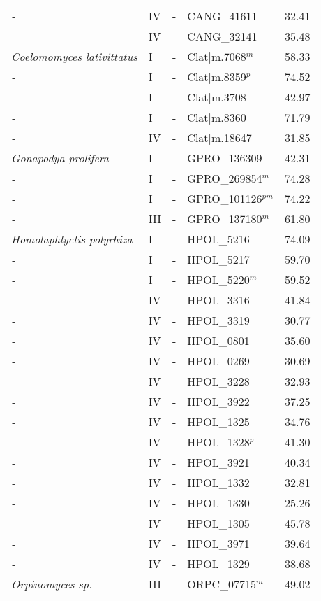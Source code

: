 {{\begin{longtable}{llllr}
  \emph{-} & IV & - & CANG\_41611 & 32.41 \\ 
  \emph{-} & IV & - & CANG\_32141 & 35.48 \\ 
  \emph{Coelomomyces lativittatus} & I & - & Clat|m.7068$^{m}$ & 58.33 \\ 
  \emph{-} & I & - & Clat|m.8359$^{p}$ & 74.52 \\ 
  \emph{-} & I & - & Clat|m.3708 & 42.97 \\ 
  \emph{-} & I & - & Clat|m.8360 & 71.79 \\ 
  \emph{-} & IV & - & Clat|m.18647 & 31.85 \\ 
  \emph{Gonapodya prolifera } & I & - & GPRO\_136309 & 42.31 \\ 
  \emph{-} & I & - & GPRO\_269854$^{m}$ & 74.28 \\ 
  \emph{-} & I & - & GPRO\_101126$^{pm}$ & 74.22 \\ 
  \emph{-} & III & - & GPRO\_137180$^{m}$ & 61.80 \\ 
  \emph{Homolaphlyctis polyrhiza} & I & - & HPOL\_5216 & 74.09 \\ 
  \emph{-} & I & - & HPOL\_5217 & 59.70 \\ 
  \emph{-} & I & - & HPOL\_5220$^{m}$ & 59.52 \\ 
  \emph{-} & IV & - & HPOL\_3316 & 41.84 \\ 
  \emph{-} & IV & - & HPOL\_3319 & 30.77 \\ 
  \emph{-} & IV & - & HPOL\_0801 & 35.60 \\ 
  \emph{-} & IV & - & HPOL\_0269 & 30.69 \\ 
  \emph{-} & IV & - & HPOL\_3228 & 32.93 \\ 
  \emph{-} & IV & - & HPOL\_3922 & 37.25 \\ 
  \emph{-} & IV & - & HPOL\_1325 & 34.76 \\ 
  \emph{-} & IV & - & HPOL\_1328$^{p}$ & 41.30 \\ 
  \emph{-} & IV & - & HPOL\_3921 & 40.34 \\ 
  \emph{-} & IV & - & HPOL\_1332 & 32.81 \\ 
  \emph{-} & IV & - & HPOL\_1330 & 25.26 \\ 
  \emph{-} & IV & - & HPOL\_1305 & 45.78 \\ 
  \emph{-} & IV & - & HPOL\_3971 & 39.64 \\ 
  \emph{-} & IV & - & HPOL\_1329 & 38.68 \\ 
  \emph{Orpinomyces sp.} & III & - & ORPC\_07715$^{m}$ & 49.02 \\ 

\end{longtable}}}
